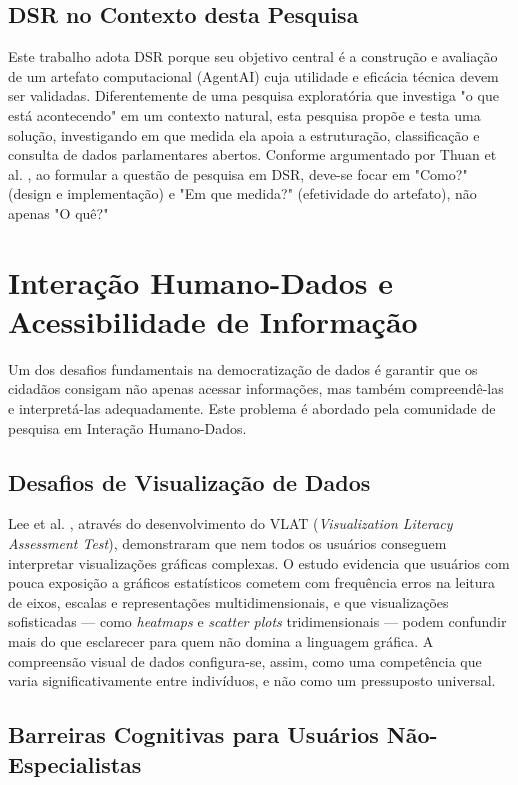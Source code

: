 \subsection{DSR no Contexto desta Pesquisa}

Este trabalho adota DSR porque seu objetivo central é a construção e avaliação de um artefato computacional (AgentAI) cuja utilidade e eficácia técnica devem ser validadas. Diferentemente de uma pesquisa exploratória que investiga "o que está acontecendo" em um contexto natural, esta pesquisa propõe e testa uma solução, investigando em que medida ela apoia a estruturação, classificação e consulta de dados parlamentares abertos. Conforme argumentado por Thuan et al. \cite{Thuan2019}, ao formular a questão de pesquisa em DSR, deve-se focar em "Como?" (design e implementação) e "Em que medida?" (efetividade do artefato), não apenas "O quê?"

\section{Interação Humano-Dados e Acessibilidade de Informação}

Um dos desafios fundamentais na democratização de dados é garantir que os cidadãos consigam não apenas acessar informações, mas também compreendê-las e interpretá-las adequadamente. Este problema é abordado pela comunidade de pesquisa em Interação Humano-Dados.

\subsection{Desafios de Visualização de Dados}

Lee et al. \cite{Lee2017}, através do desenvolvimento do VLAT (\textit{Visualization Literacy Assessment Test}), demonstraram que nem todos os usuários conseguem interpretar visualizações gráficas complexas. O estudo evidencia que usuários com pouca exposição a gráficos estatísticos cometem com frequência erros na leitura de eixos, escalas e representações multidimensionais, e que visualizações sofisticadas --- como \textit{heatmaps} e \textit{scatter plots} tridimensionais --- podem confundir mais do que esclarecer para quem não domina a linguagem gráfica. A compreensão visual de dados configura-se, assim, como uma competência que varia significativamente entre indivíduos, e não como um pressuposto universal.

\subsection{Barreiras Cognitivas para Usuários Não-Especialistas}

